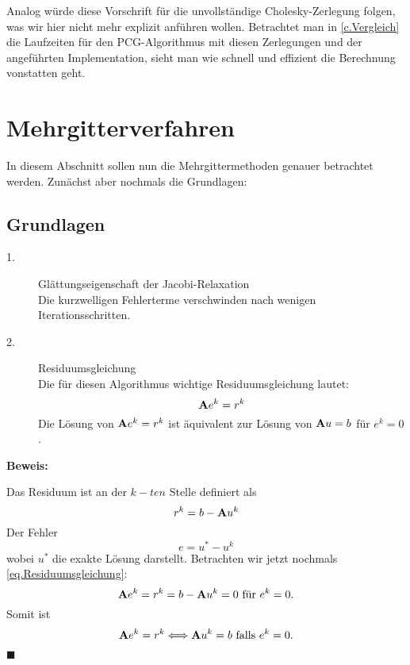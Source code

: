 Analog würde diese Vorschrift für die unvollständige Cholesky-Zerlegung folgen, was wir hier nicht mehr explizit anführen wollen. Betrachtet man in \autoref{c.Vergleich} die Laufzeiten für den PCG-Algorithmus mit diesen Zerlegungen und der angeführten Implementation, sieht man wie schnell und effizient die Berechnung vonstatten geht.

\chapter{Mehrgitterverfahren}\label{c.Mehrgitterverfahren}

In diesem Abschnitt sollen nun die Mehrgittermethoden genauer betrachtet werden. Zunächst aber nochmals die Grundlagen:

\section{Grundlagen}\label{s.Idee MGM}

\begin{description}

\item[1.] Glättungseigenschaft der Jacobi-Relaxation \\
Die kurzwelligen Fehlerterme verschwinden nach wenigen Iterationsschritten.
\item[2.] Residuumsgleichung \\
Die für diesen Algorithmus wichtige Residuumsgleichung lautet:
\begin{equation}
{\textbf{A}} e^{k} = r^{k}\label{eq.Residuumsgleichung}
\end{equation}
Die Lösung von ${\textbf{A}} e^{k} = r^{k}$ ist äquivalent zur Lösung von ${\textbf{A}}u=b$ für $e^{k} = 0$.

\end{description}

\textbf{Beweis:}

Das Residuum ist an der $k-ten$ Stelle definiert als 
\begin{equation}
r^{k} = b - {\textbf{A}}u^{k}
\end{equation}
Der Fehler
\begin{equation}
e = u^{*} - u^{k}\label{eq.Fehler}
\end{equation}
wobei $u^{*}$ die exakte Lösung darstellt.
Betrachten wir jetzt nochmals \autoref{eq.Residuumsgleichung}:
\begin{equation}
{\textbf{A}}e^{k} = r^{k} = b - {\textbf{A}}u^{k} = 0 \textnormal{ für } e^{k} = 0.
\end{equation}
Somit ist
\begin{equation}
{\textbf{A}}e^{k} = r^{k} \Longleftrightarrow {\textbf{A}}u^{k} = b \textnormal{ falls } e^{k} = 0.
\end{equation}
\begin{flushright}
$\blacksquare$
\end{flushright}

